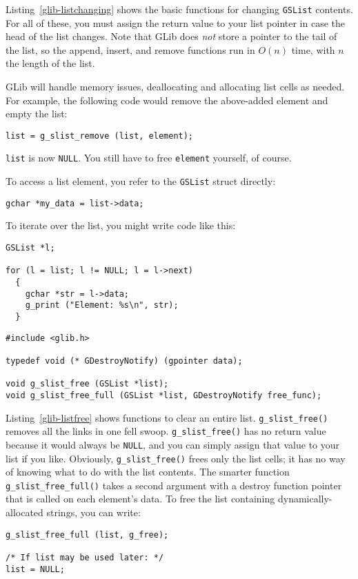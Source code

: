 Listing~\ref{glib-listchanging} shows the basic functions for changing \lstinline{GSList} contents. For all of these, you must assign the return value to your list pointer in case the head of the list changes. Note that GLib does \emph{not} store a pointer to the tail of the list, so the append, insert, and remove functions run in $O(n)$ time, with $n$ the length of the list.

GLib will handle memory issues, deallocating and allocating list cells as needed. For example, the following code would remove the above-added element and empty the list:
\begin{lstlisting}
list = g_slist_remove (list, element);
\end{lstlisting}

\lstinline{list} is now \lstinline{NULL}. You still have to free \lstinline{element} yourself, of course.

To access a list element, you refer to the \lstinline{GSList} struct directly:
\begin{lstlisting}
gchar *my_data = list->data;
\end{lstlisting}

To iterate over the list, you might write code like this:
\begin{lstlisting}
GSList *l;

for (l = list; l != NULL; l = l->next)
  {
    gchar *str = l->data;
    g_print ("Element: %s\n", str);
  }
\end{lstlisting}

\begin{lstlisting}[float, caption={Freeing entire linked lists}, label=glib-listfree]
#include <glib.h>

typedef void (* GDestroyNotify) (gpointer data);

void g_slist_free (GSList *list);
void g_slist_free_full (GSList *list, GDestroyNotify free_func);
\end{lstlisting}

Listing~\ref{glib-listfree} shows functions to clear an entire list. \lstinline{g_slist_free()} removes all the links in one fell swoop. \lstinline{g_slist_free()} has no return value because it would always be \lstinline{NULL}, and you can simply assign that value to your list if you like. Obviously, \lstinline{g_slist_free()} frees only the list cells; it has no way of knowing what to do with the list contents. The smarter function \lstinline{g_slist_free_full()} takes a second argument with a destroy function pointer that is called on each element's data. To free the list containing dynamically-allocated strings, you can write:
\begin{lstlisting}
g_slist_free_full (list, g_free);

/* If list may be used later: */
list = NULL;
\end{lstlisting}

